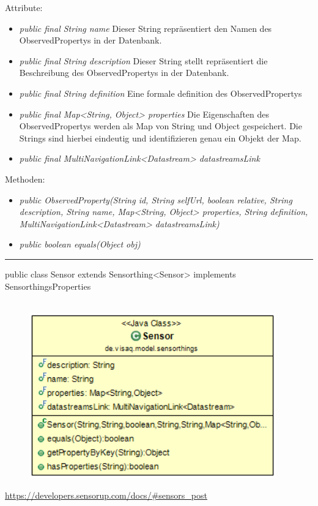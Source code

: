 Attribute:
\begin{itemize}
    \item \emph{public final String name} Dieser String repräsentiert den Namen des ObservedPropertys in der Datenbank.
    \item \emph{public final String description} Dieser String stellt repräsentiert die Beschreibung des ObservedPropertys in der Datenbank.
    \item \emph{public final String definition} Eine formale definition des ObservedPropertys
    \item \emph{public final Map<String, Object> properties} Die Eigenschaften des ObservedPropertys werden als Map von String und Object gespeichert. Die Strings sind hierbei eindeutig und identifizieren genau ein Objekt der Map.
    \item \emph{public final MultiNavigationLink<Datastream> datastreamsLink} 
\end{itemize}
Methoden:
\begin{itemize}
    \item \emph{public ObservedProperty(String id, String selfUrl, boolean relative, String description, String name, Map<String, Object> properties, String definition, MultiNavigationLink<Datastream> datastreamsLink)}
    \item \emph{public boolean equals(Object obj)} 
\end{itemize}

\rule{\textwidth}{0.4pt}
public class Sensor extends Sensorthing<Sensor> implements SensorthingsProperties
\\\\
\begin{minipage}{0.4\textwidth}
    \begin{figure}[H]
        {\centering\includegraphics[width=0.95\textwidth]{media/backend/modell/classes/Sensor.png}}
    \end{figure}
    \end{minipage} \hfill
\begin{minipage}{0.6\textwidth}
    \url{https://developers.sensorup.com/docs/#sensors_post}
\end{minipage}


